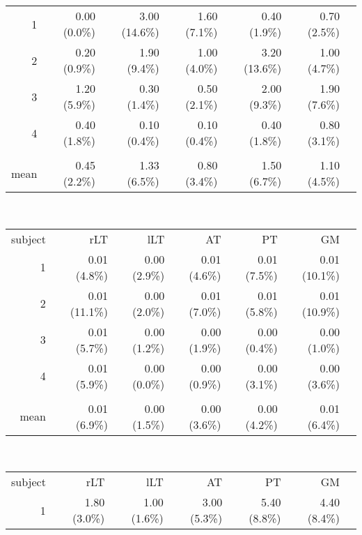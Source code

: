 \begin{table}
\begin{adjustbox}{width={0.75\textwidth},keepaspectratio}
\begin{minipage}{\linewidth}
{\begin{minipage}{\linewidth}
\begin{tabular}{rrrrrrr}
            \midrule
            1     & 0.00 (0.0\%) & 3.00 (14.6\%) & 1.60 (7.1\%) & 0.40 (1.9\%) & 0.70 (2.5\%) \\
            2     & 0.20 (0.9\%) & 1.90 (9.4\%) & 1.00 (4.0\%) & 3.20 (13.6\%) & 1.00 (4.7\%) \\
            3     & 1.20 (5.9\%) & 0.30 (1.4\%) & 0.50 (2.1\%) & 2.00 (9.3\%) & 1.90 (7.6\%) \\
            4     & 0.40 (1.8\%) & 0.10 (0.4\%) & 0.10 (0.4\%) & 0.40 (1.8\%) & 0.80 (3.1\%)  \\
                  &       &       &       &       &       \\
            mean  & 0.45 (2.2\%) & 1.33 (6.5\%) & 0.80 (3.4\%) & 1.50 (6.7\%) & 1.10 (4.5\%) \\
            \bottomrule
            \end{tabular}%
			\\[0.5ex]
            \begin{tabular}{rrrrrrr}
            \addlinespace
			\multicolumn{6}{c}{\textbf{P0$_{z}$}}\\
			\toprule
            subject & rLT   & lLT   & AT    & PT    & GM   \\
            \midrule
            1     & 0.01 (4.8\%) & 0.00 (2.9\%) & 0.01 (4.6\%) & 0.01 (7.5\%) & 0.01 (10.1\%)\\
            2     & 0.01 (11.1\%) & 0.00 (2.0\%) & 0.01 (7.0\%) & 0.01 (5.8\%) & 0.01 (10.9\%) \\
            3     & 0.01 (5.7\%) & 0.00 (1.2\%) & 0.00 (1.9\%) & 0.00 (0.4\%) & 0.00 (1.0\%)  \\
            4     & 0.01 (5.9\%) & 0.00 (0.0\%) & 0.00 (0.9\%) & 0.00 (3.1\%) & 0.00 (3.6\%) \\
                  &       &       &       &       &       \\
            mean  & 0.01 (6.9\%) & 0.00 (1.5\%) & 0.00 (3.6\%) & 0.00 (4.2\%) & 0.01 (6.4\%)  \\
            \bottomrule
            \end{tabular}%
			\\[0.5ex]
            \begin{tabular}{rrrrrrr}
	        \addlinespace
			\multicolumn{6}{c}{\textbf{FWHM$_{z}$}}\\			
	        \toprule
            subject & rLT   & lLT   & AT    & PT    & GM  \\
            \midrule
            1     & 1.80 (3.0\%) & 1.00 (1.6\%) & 3.00 (5.3\%) & 5.40 (8.8\%) & 4.40 (8.4\%) \\

\end{tabular}
\end{minipage}}
\end{minipage}
\end{adjustbox}
\end{table}
